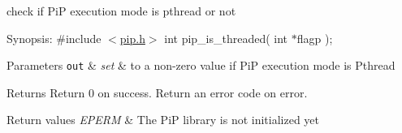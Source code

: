 check if Pi\-P execution mode is pthread or not

\begin{DoxyParagraph}{Synopsis\-:}
\#include $<$\hyperlink{pip_8h_source}{pip.\-h}$>$ int pip\-\_\-is\-\_\-threaded( int $\ast$flagp );
\end{DoxyParagraph}

\begin{DoxyParams}[1]{Parameters}
\mbox{\tt out}  & {\em set} & to a non-\/zero value if Pi\-P execution mode is Pthread\\
\hline
\end{DoxyParams}
\begin{DoxyReturn}{Returns}
Return 0 on success. Return an error code on error. 
\end{DoxyReturn}

\begin{DoxyRetVals}{Return values}
{\em E\-P\-E\-R\-M} & The Pi\-P library is not initialized yet \\
\hline
\end{DoxyRetVals}
